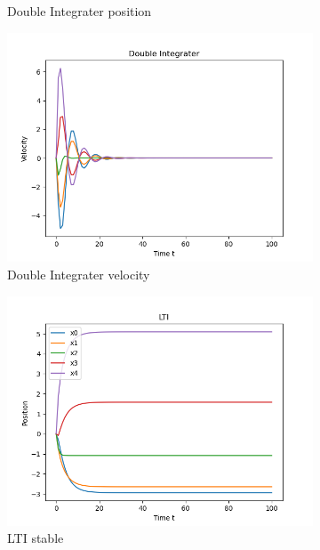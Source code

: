 \documentclass{article}
\begin{document}
\begin{problem}
\begin{figure}[!h]
\begin{subfigure}{0.4\textwidth}
            \caption{Double Integrater position}
        \end{subfigure}
        \begin{subfigure}{0.4\textwidth}
            \includegraphics[width=\textwidth]{./img/p5_3.png}
            \caption{Double Integrater velocity}
        \end{subfigure}
        \begin{subfigure}{0.4\textwidth}
            \includegraphics[width=\textwidth]{./img/p5_5.png}
            \caption{LTI stable}
        \end{subfigure}
        \begin{subfigure}{0.4\textwidth}

\end{subfigure}
\end{figure}
\end{problem}
\end{document}

